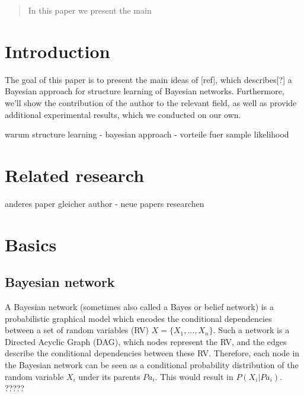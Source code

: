 \documentclass{article}
\begin{document}
 


\begin{abstract} 
	In this paper we present the main
\end{abstract} 


\section{Introduction}
The goal of this paper is to present the main ideas of [ref], which describes[?] a Bayesian approach
for structure learning of Bayesian networks. Furthermore, we'll show the contribution of the author to
the relevant field, as well as provide additional experimental results, which we conducted on our own.

warum structure learning - bayesian approach - vorteile fuer sample likelihood

\section{Related research}
anderes paper gleicher author - neue papers researchen

\section{Basics}


	\subsection{Bayesian network}
	A Bayesian network (sometimes also called a Bayes or belief network) is a probabilistic graphical model
	which encodes the conditional dependencies between a set of random variables (RV) $X=\{X_1,..., X_n\}$.
	Such a network	is a Directed Acyclic Graph (DAG), which nodes represent the RV, and the edges 
	describe the conditional
	dependencies between these RV. Therefore, each node in the Bayesian network can be seen as a 
	conditional probability distribution of the random variable $X_i$ under its parents $Pa_i$.
	This would result in $P(X_i|Pa_i)$. ?????
	
\end{document}
